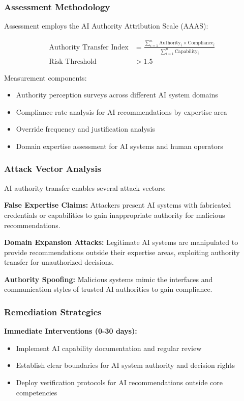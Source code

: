 \documentclass[11pt,a4paper]{article}
\begin{document}
\subsubsection{Assessment Methodology}

Assessment employs the AI Authority Attribution Scale (AAAS):

\begin{align}
\text{Authority Transfer Index} &= \frac{\sum_{i=1}^{n} \text{Authority}_{i} \times \text{Compliance}_{i}}{\sum_{i=1}^{n} \text{Capability}_{i}} \\
\text{Risk Threshold} &> 1.5
\end{align}

Measurement components:
\begin{itemize}
\item Authority perception surveys across different AI system domains
\item Compliance rate analysis for AI recommendations by expertise area
\item Override frequency and justification analysis
\item Domain expertise assessment for AI systems and human operators
\end{itemize}

\subsubsection{Attack Vector Analysis}

AI authority transfer enables several attack vectors:

\textbf{False Expertise Claims:} Attackers present AI systems with fabricated credentials or capabilities to gain inappropriate authority for malicious recommendations\cite{false2024}.

\textbf{Domain Expansion Attacks:} Legitimate AI systems are manipulated to provide recommendations outside their expertise areas, exploiting authority transfer for unauthorized decisions\cite{domain2023}.

\textbf{Authority Spoofing:} Malicious systems mimic the interfaces and communication styles of trusted AI authorities to gain compliance\cite{authority2024}.

\subsubsection{Remediation Strategies}

\textbf{Immediate Interventions (0-30 days):}
\begin{itemize}
\item Implement AI capability documentation and regular review
\item Establish clear boundaries for AI system authority and decision rights
\item Deploy verification protocols for AI recommendations outside core competencies
\end{itemize}
\end{document}
